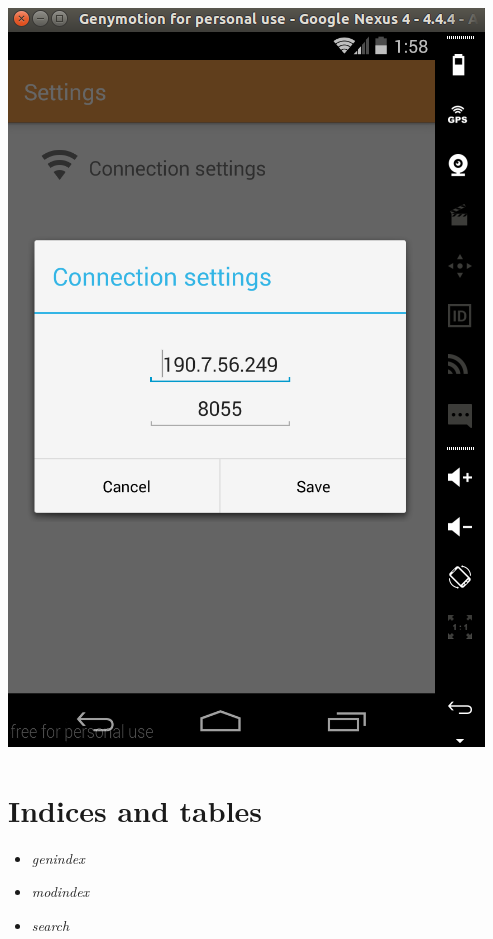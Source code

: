 \documentclass[letterpaper,10pt,english]{sphinxmanual}
\begin{document}
\includegraphics{connectionSettings2.png}


\chapter{Indices and tables}
\label{index:indices-and-tables}\begin{itemize}
\item {} 
\emph{genindex}

\item {} 
\emph{modindex}

\item {} 
\emph{search}

\end{itemize}



\renewcommand{\indexname}{Index}
\printindex
\end{document}

